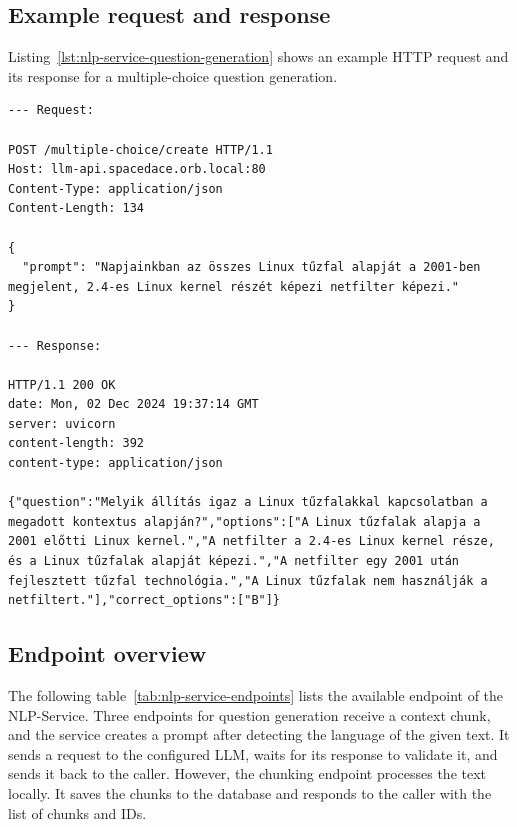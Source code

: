 \subsection{Example request and response}

Listing~\ref{lst:nlp-service-question-generation} shows an example HTTP request and its response for a multiple-choice question generation.

\begin{lstlisting}[caption=Validation example,label=lst:nlp-service-question-generation]
--- Request:

POST /multiple-choice/create HTTP/1.1
Host: llm-api.spacedace.orb.local:80
Content-Type: application/json
Content-Length: 134

{
  "prompt": "Napjainkban az összes Linux tűzfal alapját a 2001-ben megjelent, 2.4-es Linux kernel részét képezi netfilter képezi."
}

--- Response:

HTTP/1.1 200 OK
date: Mon, 02 Dec 2024 19:37:14 GMT
server: uvicorn
content-length: 392
content-type: application/json

{"question":"Melyik állítás igaz a Linux tűzfalakkal kapcsolatban a megadott kontextus alapján?","options":["A Linux tűzfalak alapja a 2001 előtti Linux kernel.","A netfilter a 2.4-es Linux kernel része, és a Linux tűzfalak alapját képezi.","A netfilter egy 2001 után fejlesztett tűzfal technológia.","A Linux tűzfalak nem használják a netfiltert."],"correct_options":["B"]}

\end{lstlisting}

\subsection{Endpoint overview}

The following table~\ref{tab:nlp-service-endpoints} lists the available endpoint of the NLP-Service. Three endpoints for question generation receive a context chunk, and the service creates a prompt after detecting the language of the given text. It sends a request to the configured LLM, waits for its response to validate it, and sends it back to the caller. However, the chunking endpoint processes the text locally. It saves the chunks to the database and responds to the caller with the list of chunks and IDs.

